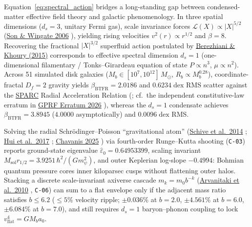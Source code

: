 \documentclass[11pt,letterpaper]{article}
\begin{document}
Equation~\eqref{eq:spectral_action} bridges a long-standing gap between condensed-matter effective field theory and galactic phenomenology. In three spatial dimensions ($d_s = 3$, unitary Fermi gas), scale invariance forces $\mathcal{L}(X) \propto |X|^{5/2}$ (\href{https://arxiv.org/abs/cond-mat/0509786}{Son \& Wingate 2006} \cite{SonWingate2006}), yielding rising velocities $v^2(r) \propto r^{1/2}$ and $\beta = 8$. Recovering the fractional $|X|^{3/2}$ superfluid action postulated by \href{https://link.aps.org/doi/10.1103/PhysRevD.92.103510}{Berezhiani \& Khoury (2015)} \cite{BerezhianiKhoury2015} corresponds to effective spectral dimension $d_s = 1$ (one-dimensional filamentary / Tonks--Girardeau equation of state $P \propto n^3$, $\mu \propto n^2$). Across 51 simulated disk galaxies ($M_b \in [10^7, 10^{12}]\,M_\odot$, $R_b \propto M_b^{0.28}$), coordinate-fractal $D_f = 2$ gravity yields $\beta_{\mathrm{BTFR}} = 2.0186$ and $0.6234\;\mathrm{dex}$ RMS scatter against the \href{https://link.aps.org/doi/10.1103/PhysRevLett.117.201101}{SPARC} Radial Acceleration Relation (\cite{McGaugh2016}; cf.\ the independent constitutive-law erratum in \href{https://zenodo.org/records/23247342/files/GPRF_Erratum_v1.0.14_20261008.pdf?download=1}{GPRF Erratum 2026} \cite{GPRFErratum2026}), whereas the $d_s = 1$ condensate achieves $\beta_{\mathrm{BTFR}} = 3.8945$ ($4.0000$ asymptotically) and $0.0096\;\mathrm{dex}$ RMS.

Solving the radial Schr\"odinger--Poisson ``gravitational atom'' (\href{https://arxiv.org/abs/1406.6586}{Schive et al.\ 2014} \cite{Schive2014}; \href{https://link.aps.org/doi/10.1103/PhysRevD.95.043541}{Hui et al.\ 2017} \cite{Hui2017}; \href{https://www.frontiersin.org/journals/astronomy-and-space-sciences/articles/10.3389/fspas.2025.1538434/full}{Chavanis 2025} \cite{Chavanis2025}) via fourth-order Runge--Kutta shooting (\texttt{C-03}) reports ground-state eigenvalue $\hat{\varepsilon}_0 = 0.64953399$, scaling invariant $M_{\mathrm{sol}} r_{1/2} = 3.9251\,\hbar^2/(G m_\psi^2)$, and outer Keplerian log-slope $-0.4994$: Bohmian quantum pressure cores inner kiloparsec cusps without flattening outer halos. Stacking a discrete scale-invariant axiverse cascade $m_k = m_0 b^{-k}$ (\href{https://link.aps.org/doi/10.1103/PhysRevD.81.123530}{Arvanitaki et al.\ 2010} \cite{Arvanitaki2010}, \texttt{C-06}) can sum to a flat envelope only if the adjacent mass ratio satisfies $b \le 6.2$ ($\le 5\%$ velocity ripple; $\pm 0.036\%$ at $b = 2.0$, $\pm 4.561\%$ at $b = 6.0$, $\pm 6.084\%$ at $b = 7.0$), and still requires $d_s = 1$ baryon--phonon coupling to lock $v_{\mathrm{flat}}^4 = G M_b a_0$.
\end{document}
